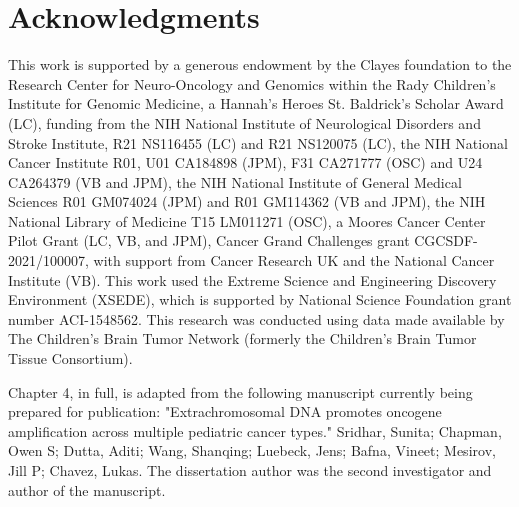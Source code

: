 \section{Acknowledgments}

This work is supported by a generous endowment by the Clayes foundation to the Research Center for Neuro-Oncology and Genomics within the Rady Children’s Institute for Genomic Medicine, a Hannah’s Heroes St. Baldrick’s Scholar Award (LC), funding from the NIH National Institute of Neurological Disorders and Stroke Institute, R21 NS116455 (LC) and R21 NS120075 (LC), the NIH National Cancer Institute R01, U01 CA184898 (JPM), F31 CA271777 (OSC) and U24 CA264379 (VB and JPM), the NIH National Institute of General Medical Sciences R01 GM074024 (JPM) and R01 GM114362 (VB and JPM), the NIH National Library of Medicine T15 LM011271 (OSC), a Moores Cancer Center Pilot Grant (LC, VB, and JPM), Cancer Grand Challenges grant CGCSDF-2021/100007, with support from Cancer Research UK and the National Cancer Institute (VB). This work used the Extreme Science and Engineering Discovery Environment (XSEDE), which is supported by National Science Foundation grant number ACI-1548562. This research was conducted using data made available by The Children’s Brain Tumor Network (formerly the Children’s Brain Tumor Tissue Consortium).

\par Chapter 4, in full, is adapted from the following manuscript currently being prepared for publication: "Extrachromosomal DNA promotes oncogene amplification across multiple pediatric cancer types." Sridhar, Sunita; Chapman, Owen S; Dutta, Aditi; Wang, Shanqing; Luebeck, Jens; Bafna, Vineet; Mesirov, Jill P; Chavez, Lukas.
The dissertation author was the second investigator and author of the manuscript.
